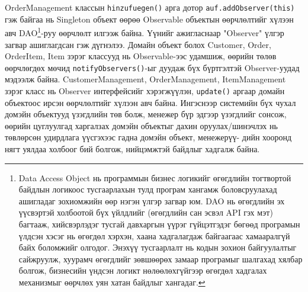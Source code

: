 OrderManagement классын \verb|hinzufuegen()| арга дотор \verb|auf.addObserver(this)| гэж байгаа нь Singleton объект өөрөө Observable объектын өөрчлөлтийг хүлээн авч DAO\footnote{Data Access Object нь программын бизнес логикийг өгөгдлийн тогтвортой байдлын логикоос тусгаарлахын тулд програм хангамж боловсруулахад ашигладаг зохиомжийн өөр нэгэн үлгэр загвар юм. DAO нь өгөгдлийн эх үүсвэртэй холбоотой бүх үйлдлийг (өгөгдлийн сан эсвэл API гэх мэт) багтааж, хийсвэрлэдэг тусгай давхаргын үүрэг гүйцэтгэдэг бөгөөд програмын үлдсэн хэсэг нь өгөгдөл хэрхэн, хаана хадгалагдаж байгаагаас хамааралгүй байх боломжийг олгодог. Энэхүү тусгаарлалт нь кодын зохион байгуулалтыг сайжруулж, хуурамч өгөгдлийг зөвшөөрөх замаар програмыг шалгахад хялбар болгож, бизнесийн үндсэн логикт нөлөөлөхгүйгээр өгөгдөл хадгалах механизмыг өөрчлөх уян хатан байдлыг хангадаг.}-руу өөрчлөлт илгээж байна. Үүнийг ажигласнаар "Observer" үлгэр загвар ашиглагдсан гэж дүгнэлээ. Домайн объект болох Customer, Order, OrderItem, Item зэрэг классууд нь Observable-ээс удамшиж, өөрийн төлөв өөрчлөгдөх мөчид \verb|notifyObservers()|-ыг дуудаж бүх бүртгэлтэй Observer-уудад мэдээлж байна. CustomerManagement, OrderManagement, ItemManagement зэрэг класс нь Observer интерфейсийг хэрэгжүүлэн, \verb|update()| аргаар домайн объектоос ирсэн өөрчлөлтийг хүлээн авч байна. Ингэснээр системийн бүх чухал домэйн объектууд үзэгдлийн төв болж, менежер бүр эдгээр үзэгдлийг сонсож, өөрийн цуглуулгад харгалзах домэйн объектыг дахин оруулах/шинэчлэх нь төвлөрсөн удирдлага үүсгэхээс гадна домэйн объект, менежерүү- дийн хооронд нягт уялдаа холбоог бий болгож, нийцэмжтэй байдлыг хадгалж байна.

